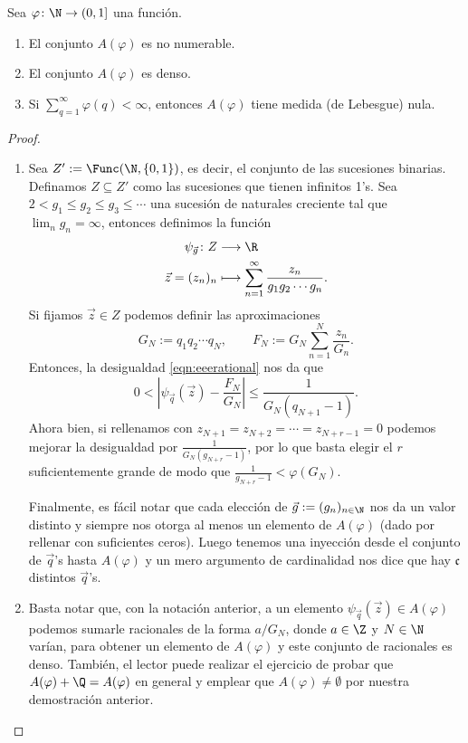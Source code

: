 \documentclass[teoria-numeros.tex]{subfiles}
\begin{document}
\begin{thm}[Khinchin]
	Sea $\varphi \colon \N \to (0, 1]$ una función.
	\begin{enumerate}
		\item El conjunto $A(\varphi)$ es no numerable.
		\item El conjunto $A(\varphi)$ es denso.
		\item Si $\sum_{q=1}^{\infty} \varphi(q) < \infty$, entonces $A(\varphi)$ tiene medida (de Lebesgue) nula.
	\end{enumerate}
\end{thm}
\begin{proof}
	\begin{enumerate}
		\item Sea $Z' := \Func(\N, \{ 0, 1 \})$, es decir, el conjunto de las sucesiones binarias.
			Definamos $Z \subseteq Z'$ como las sucesiones que tienen infinitos 1's.
			Sea $2 < g_1 \le g_2 \le g_3 \le \cdots$ una sucesión de naturales creciente tal que $\lim_n g_n = \infty$,
			entonces definimos la función
			\begin{align*}
				\psi_{\vec g} \colon Z &\longrightarrow \R \\
				\vec z = (z_n)_n &\longmapsto \sum_{n=1}^{\infty} \frac{z_n}{g_1 g_2 \cdots g_n}.
			\end{align*}
			Si fijamos $\vec z \in Z$ podemos definir las aproximaciones
			$$ G_N := q_1 q_2 \cdots q_N, \qquad F_N := G_N \sum_{n=1}^{N} \frac{z_n}{G_n}. $$
			Entonces, la desigualdad \eqref{eqn:eeerational} nos da que
			\[
				0 < \left| \psi_{\vec q}(\vec z) - \frac{F_N}{G_N} \right| \le \frac{1}{G_N(q_{N+1} - 1)}.
			\]
			Ahora bien, si rellenamos con $z_{N+1} = z_{N+2} = \cdots = z_{N + r - 1} = 0$ podemos mejorar la desigualdad por
			$\frac{1}{G_N(g_{N + r} - 1)}$, por lo que basta elegir el $r$ suficientemente grande de modo que $\frac{1}{g_{N+r} - 1} < \varphi(G_N)$.

			Finalmente, es fácil notar que cada elección de $\vec g := (g_n)_{n \in \N}$ nos da un valor distinto y siempre nos otorga al menos
			un elemento de $A(\varphi)$ (dado por rellenar con suficientes ceros).
			Luego tenemos una inyección desde el conjunto de $\vec q$'s hasta $A(\varphi)$ y un mero argumento de cardinalidad nos dice que
			hay $\mathfrak{c}$ distintos $\vec q$'s.

		\item Basta notar que, con la notación anterior, a un elemento $\psi_{\vec q}(\vec z) \in A(\varphi)$ podemos sumarle racionales de la forma $a/G_N$,
			donde $a \in \Z$ y $N \in \N$ varían, para obtener un elemento de $A(\varphi)$ y este conjunto de racionales es denso.
			También, el lector puede realizar el ejercicio de probar que $A(\varphi) + \Q = A(\varphi)$ en general y emplear que $A(\varphi) \ne
			\emptyset$ por nuestra demostración anterior.


\end{enumerate}
\end{proof}
\end{document}
